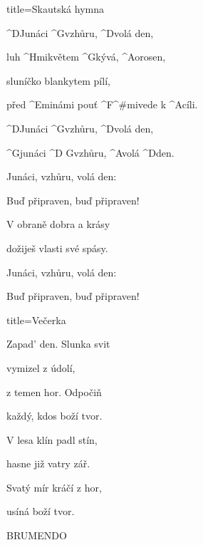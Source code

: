 \begin{song}{title=\predtitle \centering Skautská hymna \\\normalsize  \vspace*{-0.3cm}}  %
\begin{centerjustified}
\nejvetsi

	^{D}Junáci ^{G}vzhůru, ^{D}volá den,

	luh ^{Hmi}květem ^{G}kývá, ^{A}orosen,

	sluníčko blankytem pílí,

	před ^{Emi}námi pouť ^{F^{\#}mi}vede k ^{A}cíli.

	^{D}Junáci ^{G}vzhůru, ^{D}volá den,

	^{G}junáci ^{D G}vzhůru, ^{A}volá ^{D}den. 

\phantom{.}

	Junáci, vzhůru, volá den:

	Buď připraven, buď připraven!
	
	V obraně dobra a krásy

	dožiješ vlasti své spásy.

	Junáci, vzhůru, volá den:
	
	Buď připraven, buď připraven!
\end{centerjustified}
\setcounter{Slokočet}{0}
\end{song}

\vspace*{4cm}
\begin{song}{title=\predtitle \centering Večerka \vspace*{-0.3cm}}
	\begin{centerjustified}
\nejvetsi

	\sloka
	Zapad' den. Slunka svit

	vymizel z údolí,

	z temen hor. Odpočiň

	každý, kdos boží tvor.

	\sloka
	V lesa klín padl stín,

	hasne již vatry zář.

	Svatý mír kráčí z hor,

	usíná boží tvor.

	\sloka
	BRUMENDO
\end{centerjustified}
\setcounter{Slokočet}{0}
\end{song}

